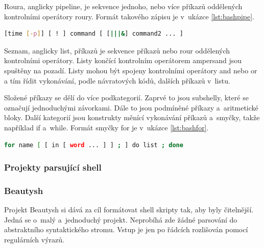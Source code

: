 \documentclass[thesis=M,czech]{FITthesis}[2012/06/26]
\begin{document}
Roura, anglicky pipeline, je sekvence jednoho, nebo více příkazů oddělených kontrolními operátory roury. Formát takového zápisu je v~ukázce \ref{lst:bashpipe}.

\begin{minipage}{\linewidth}
\begin{lstlisting}[language=bash, caption={Formát roury v~Bashi}, label={lst:bashpipe}]
[time [-p]] [ ! ] command [ [|||&] command2 ... ]
\end{lstlisting}
\end{minipage}

Seznam, anglicky list, 	příkazů je sekvence příkazů nebo rour oddělených kontrolními operátory. Listy končící kontrolním operátorem ampersand jsou spuštěny na pozadí. Listy mohou být spojeny kontrolními operátory and nebo or a tím řídit vykonávání, podle návratových kódů, dalších příkazů v~listu.

Složené příkazy se dělí do více podkategorií. Zaprvé to jsou subshelly, které se označují jednoduchými závorkami. Dále to jsou podmíněné příkazy a~aritmetické bloky. Další kategorií jsou konstrukty měnící vykonávání příkazů a~smyčky, takže například if a~while. Formát smyčky for je v~ukázce \ref{lst:bashfor}.

\begin{minipage}{\linewidth}
\begin{lstlisting}[language=bash, caption={Formát jedné varianty cyklu for v~Bashi}, label={lst:bashfor}]
for name [ [ in [ word ... ] ] ; ] do list ; done
\end{lstlisting}
\end{minipage}




\subsubsection{Projekty parsující shell}

%
\subsubsection{Beautysh}

Projekt Beautysh \cite{beautysh} si dává za cíl formátovat shell skripty tak, aby byly čitelnější. Jedná se o~malý a~jednoduchý projekt. Neprobíhá zde žádné parsování do abstraktního syntaktického stromu. Vstup je jen po řádcích rozlišován pomocí regulárních výrazů.
\end{document}
